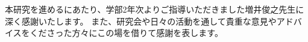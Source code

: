 \begin{acknowledgment}
  本研究を進めるにあたり、学部2年次よりご指導いただきました増井俊之先生に深く感謝いたします。
  また、研究会や日々の活動を通して貴重な意見やアドバイスをくださった方々にこの場を借りて感謝を表します。
\end{acknowledgment}
